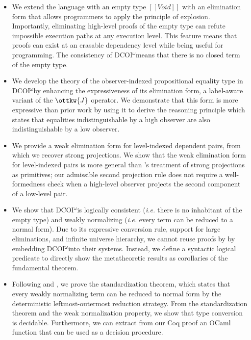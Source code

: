 \documentclass[acmsmall]{acmart}
\makeatletter
\theoremstyle{linked}
\theoremstyle{deflinked}
\theoremstyle{acmdefinition}
\newcommand{\name}{\texorpdfstring{DCOI$^{\omega}$\@\xspace}{DCOI-omega}}
\newcommand{\ie}{\textit{i.e.}\@\xspace}
\makeatother
\begin{document}
\begin{itemize}[leftmargin=\parindent]
\item We extend the language with an empty type $[[Void]]$ with an elimination
  form that allows programmers to apply the principle of explosion.
  Importantly, eliminating high-level proofs of the empty
  type can refute impossible execution paths at any execution level. This
  feature means that proofs can exist at an erasable dependency level while
  being useful for programming. The consistency of \name means that there is
  no closed term of the empty type.

\item We develop the theory of the observer-indexed propositional equality
  type in \name by enhancing the expressiveness of its elimination form, a
  label-aware variant of the $\ottkw{J}$ operator. We demonstrate that this
  form is more expressive than prior work by using it to derive the reasoning
  principle which states that equalities indistinguishable by a high observer
  are also indistinguishable by a low observer.

\item We provide a weak elimination form for level-indexed dependent pairs,
  from which we recover strong projections. We show that the weak elimination
  form for level-indexed pairs is more general than \citeauthor{liu:dcoi}'s
  treatment of strong projections as primitives; our admissible second
  projection rule does not require a well-formedness check when a high-level
  observer projects the second component of a low-level pair.

\item We show that \name is logically consistent (\ie there is no inhabitant of
  the empty type) and weakly normalizing (\ie every term can be reduced to a normal
  form). Due to its expressive conversion rule, support for large eliminations,
  and infinite universe hierarchy, we cannot reuse
  proofs by \citet{geuvers:cc-sn, abel:irrelevance}
  by embedding \name into their systems. Instead, we define a
  syntactic logical predicate to directly show the
  metatheoretic results as corollaries of the fundamental theorem.

\item Following \citet{takahashi:par} and
  \citet{accattoli:factorization}, we prove the standardization
  theorem, which states that every weakly normalizing term can be
  reduced to normal form by the deterministic leftmost-outermost reduction
  strategy. From the standardization theorem and the weak
  normalization property, we show that type conversion is decidable.
  Furthermore, we can extract from our Coq proof an OCaml function that can
  be used as a decision procedure.
\end{itemize}
\end{document}
